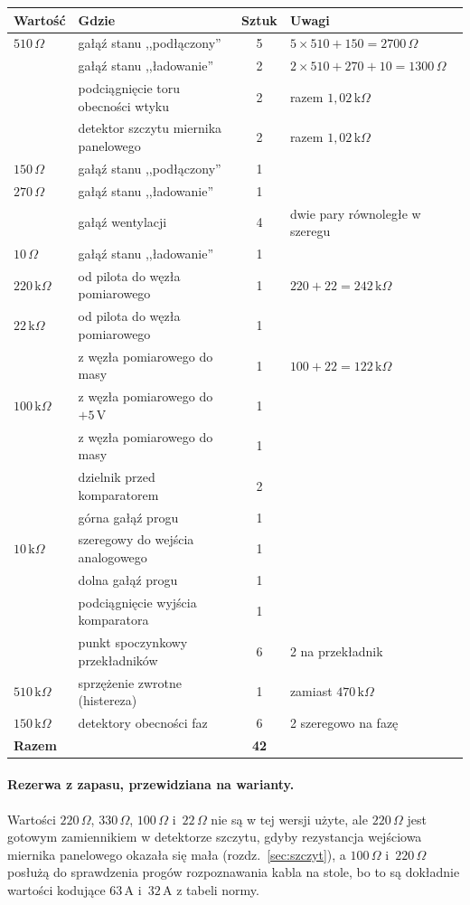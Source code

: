 \documentclass[a4paper,11pt]{article}
\newcommand{\ohm}{\,\Omega}
\newcommand{\kohm}{\,\mathrm{k}\Omega}
\newcommand{\volt}{\,\mathrm{V}}
\newcommand{\amp}{\,\mathrm{A}}
\begin{document}
\begin{center}
\begin{tabular}{llcl}
\toprule
Wartość & Gdzie & Sztuk & Uwagi \\
\midrule
$510\ohm$ & gałąź stanu ,,podłączony'' & 5 & $5\times510+150=2700\ohm$ \\
          & gałąź stanu ,,ładowanie''  & 2 & $2\times510+270+10=1300\ohm$ \\
          & podciągnięcie toru obecności wtyku & 2 & razem $1{,}02\kohm$ \\
          & detektor szczytu miernika panelowego & 2 & razem $1{,}02\kohm$ \\
$150\ohm$ & gałąź stanu ,,podłączony'' & 1 & \\
$270\ohm$ & gałąź stanu ,,ładowanie'' & 1 & \\
          & gałąź wentylacji & 4 & dwie pary równoległe w szeregu \\
$10\ohm$  & gałąź stanu ,,ładowanie'' & 1 & \\
\midrule
$220\kohm$ & od pilota do węzła pomiarowego & 1 & $220+22=242\kohm$ \\
$22\kohm$  & od pilota do węzła pomiarowego & 1 & \\
           & z węzła pomiarowego do masy & 1 & $100+22=122\kohm$ \\
$100\kohm$ & z węzła pomiarowego do $+5\volt$ & 1 & \\
           & z węzła pomiarowego do masy & 1 & \\
           & dzielnik przed komparatorem & 2 & \\
           & górna gałąź progu & 1 & \\
$10\kohm$  & szeregowy do wejścia analogowego & 1 & \\
           & dolna gałąź progu & 1 & \\
           & podciągnięcie wyjścia komparatora & 1 & \\
           & punkt spoczynkowy przekładników & 6 & 2 na przekładnik \\
$510\kohm$ & sprzężenie zwrotne (histereza) & 1 & zamiast $470\kohm$ \\
$150\kohm$ & detektory obecności faz & 6 & 2 szeregowo na fazę \\
\midrule
\multicolumn{2}{l}{\textbf{Razem}} & \textbf{42} & \\
\bottomrule
\end{tabular}
\end{center}

\paragraph{Rezerwa z zapasu, przewidziana na warianty.} Wartości $220\ohm$,
$330\ohm$, $100\ohm$ i~$22\ohm$ nie są w tej wersji użyte, ale $220\ohm$ jest
gotowym zamiennikiem w detektorze szczytu, gdyby rezystancja wejściowa miernika
panelowego okazała się mała (rozdz.~\ref{sec:szczyt}), a $100\ohm$ i~$220\ohm$
posłużą do sprawdzenia progów rozpoznawania kabla na stole, bo to są dokładnie
wartości kodujące $63\amp$ i~$32\amp$ z tabeli normy.
\end{document}
